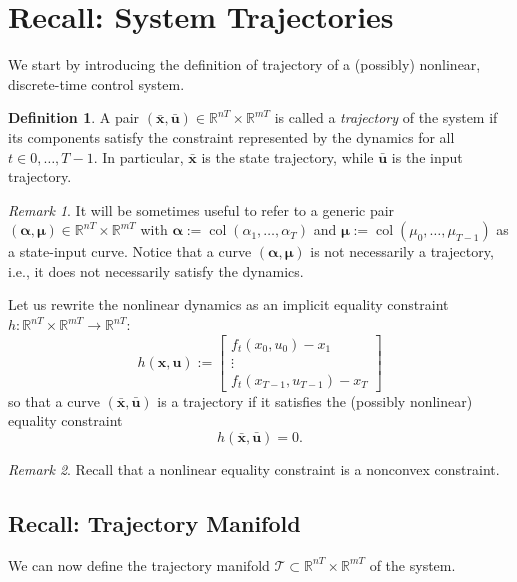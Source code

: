 \documentclass[openany]{book}
\DeclareMathOperator{\col}{col}           %
\theoremstyle{definition}
\newtheorem{definition}{Definition}[section]
\theoremstyle{remark}
\newtheorem*{remark}{Remark}
\begin{document}
\section{Recall: System Trajectories}
We start by introducing the definition of trajectory of a (possibly) nonlinear, discrete-time control system.

\begin{definition}
A pair $(\bar{\mathbf{x}}, \bar{\mathbf{u}}) \in \mathbb{R}^{nT} \times \mathbb{R}^{mT}$ is called a \emph{trajectory} of the system if its components satisfy the constraint represented by the dynamics for all $t \in 0,\ldots,T-1$. In particular, $\bar{\mathbf{x}}$ is the state trajectory, while $\bar{\mathbf{u}}$ is the input trajectory.
\end{definition}

\begin{remark}
It will be sometimes useful to refer to a generic pair $(\boldsymbol{\alpha}, \boldsymbol{\mu}) \in \mathbb{R}^{nT} \times \mathbb{R}^{mT}$ with $\boldsymbol{\alpha} := \col(\alpha_1,\ldots,\alpha_T)$ and $\boldsymbol{\mu} := \col(\mu_0,\ldots,\mu_{T-1})$ as a state-input curve. Notice that a curve $(\boldsymbol{\alpha}, \boldsymbol{\mu})$ is not necessarily a trajectory, i.e., it does not necessarily satisfy the dynamics.
\end{remark}

Let us rewrite the nonlinear dynamics as an implicit equality constraint $h : \mathbb{R}^{nT} \times \mathbb{R}^{mT} \to \mathbb{R}^{nT}$:
\[
    h(\mathbf{x}, \mathbf{u}) := \begin{bmatrix}
        f_t(x_0, u_0) - x_1 \\
        \vdots \\
        f_t(x_{T-1}, u_{T-1}) - x_T
    \end{bmatrix}
\]
so that a curve $(\bar{\mathbf{x}}, \bar{\mathbf{u}})$ is a trajectory if it satisfies the (possibly nonlinear) equality constraint
\[
    h(\bar{\mathbf{x}}, \bar{\mathbf{u}}) = 0.
\]

\begin{remark}
Recall that a nonlinear equality constraint is a nonconvex constraint.
\end{remark}

\subsection{Recall: Trajectory Manifold}
We can now define the trajectory manifold $\mathcal{T} \subset \mathbb{R}^{nT} \times \mathbb{R}^{mT}$ of the system.
\end{document}
